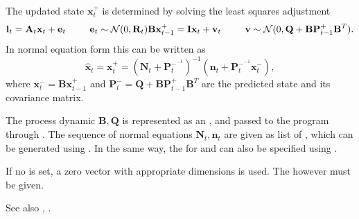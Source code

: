 The updated state $\mathbf{x}_t^+$ is determined by solving the least squares adjustment
\begin{equation}
\mathbf{l}_t = \mathbf{A}_t \mathbf{x}_t + \mathbf{e}_t \hspace{25pt} \mathbf{e}_t \sim \mathcal{N}(0, \mathbf{R}_t)\\
\mathbf{B} \mathbf{x}^+_{t-1} = \mathbf{I} \mathbf{x}_t + \mathbf{v}_t\hspace{25pt} \mathbf{v} \sim \mathcal{N}(0,\mathbf{Q} + \mathbf{B} \mathbf{P}^+_{t-1}\mathbf{B}^T).
\end{equation}
In normal equation form this can be written as
\begin{equation}
\hat{\mathbf{x}}_t = \mathbf{x}^+_t = (\mathbf{N}_t + \mathbf{P}^{-^{-1}}_t)^{-1}(\mathbf{n}_t + \mathbf{P}^{-^{-1}}_t \mathbf{x}^-_t),
\end{equation}
where $\mathbf{x}_t^- = \mathbf{B} \mathbf{x}^+_{t-1}$ and $\mathbf{P}_t^{-} = \mathbf{Q} + \mathbf{B} \mathbf{P}^+_{t-1}\mathbf{B}^T$
are the predicted state and its covariance matrix.

The process dynamic $\mathbf{B}, \mathbf{Q}$ is represented as an ,
and passed to the program through .
The sequence of normal equations $\mathbf{N}_t, \mathbf{n}_t$ are given as list of ,
which can be generated using .
In the same way, the  for  and 
can also be specified using .

If no  is set, a zero vector with appropriate dimensions is used.
The  however must be given.

See also , .


